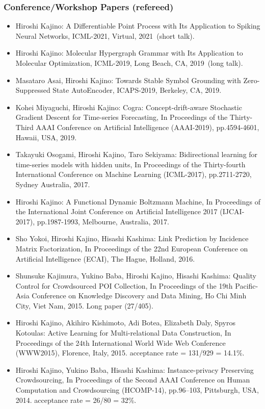 \documentclass[a4paper,9pt]{article}
\begin{document}
\subsubsection*{Conference/Workshop Papers (refereed)}
\begin{itemize}
 \item Hiroshi Kajino: A Differentiable Point Process with Its Application to Spiking Neural Networks, ICML-2021, Virtual, 2021~(short talk).
 \item Hiroshi Kajino: Molecular Hypergraph Grammar with Its Application to Molecular Optimization, ICML-2019, Long Beach, CA, 2019~(long talk).
 \item Masataro Asai, Hiroshi Kajino: Towards Stable Symbol Grounding with Zero-Suppressed State AutoEncoder, ICAPS-2019, Berkeley, CA, 2019.
 \item Kohei Miyaguchi, Hiroshi Kajino: Cogra: Concept-drift-aware Stochastic Gradient Descent for Time-series Forecasting, In Proceedings of the Thirty-Third AAAI Conference on Artificial Intelligence (AAAI-2019), pp.4594-4601, Hawaii, USA, 2019.
 \item Takayuki Osogami, Hiroshi Kajino, Taro Sekiyama: Bidirectional learning for time-series models with hidden units, In Proceedings of the Thirty-fourth International Conference on Machine Learning (ICML-2017), pp.2711-2720, Sydney Australia, 2017.
 \item Hiroshi Kajino: A Functional Dynamic Boltzmann Machine, In Proceedings of the International Joint Conference on Artificial Intelligence 2017 (IJCAI-2017), pp.1987-1993, Melbourne, Australia, 2017.
 \item Sho Yokoi, Hiroshi Kajino, Hisashi Kashima: Link Prediction by Incidence Matrix Factorization, In Proceedings of the 22nd European Conference on Artificial Intelligence (ECAI), The Hague, Holland, 2016.
 \item Shunsuke Kajimura, Yukino Baba, Hiroshi Kajino, Hisashi Kashima: Quality Control for Crowdsourced POI Collection, In Proceedings of the 19th Pacific-Asia Conference on Knowledge Discovery and Data Mining, Ho Chi Minh City, Viet Nam, 2015. Long paper (27/405).
 \item Hiroshi Kajino, Akihiro Kishimoto, Adi Botea, Elizabeth Daly, Spyros Kotoulas: Active Learning for Multi-relational Data Construction, In Proceedings of the 24th International World Wide Web Conference (WWW2015), Florence, Italy, 2015. acceptance rate = 131/929 = 14.1\%.
 \item Hiroshi Kajino, Yukino Baba, Hisashi Kashima: Instance-privacy Preserving Crowdsourcing, In Proceedings of the Second AAAI Conference on Human Computation and Crowdsourcing (HCOMP-14), pp.96--103, Pittsburgh, USA, 2014. acceptance rate = 26/80 = 32\%.

\end{itemize}
\end{document}
